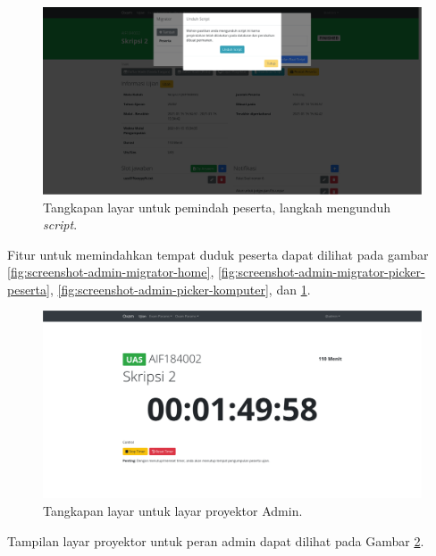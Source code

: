     \begin{figure}
        \centering
        \includegraphics[width=0.7\paperwidth]{Gambar/implemented-interface/admin/migrator-download.png}
        \caption{Tangkapan layar untuk pemindah peserta, langkah mengunduh \textit{script}.}
        \label{fig:screenshot-admin-picker-download}
    \end{figure}
    Fitur untuk memindahkan tempat duduk peserta dapat dilihat pada gambar \ref{fig:screenshot-admin-migrator-home},
    \ref{fig:screenshot-admin-migrator-picker-peserta}, \ref{fig:screenshot-admin-picker-komputer}, dan 
    \ref{fig:screenshot-admin-picker-download}.
    
    \begin{figure}
        \centering
        \includegraphics[width=0.7\paperwidth]{Gambar/implemented-interface/admin/timer-admin.png}
        \caption{Tangkapan layar untuk layar proyektor Admin.}
        \label{fig:screenshot-admin-exam-projector}
    \end{figure}
    Tampilan layar proyektor untuk peran admin dapat dilihat pada Gambar \ref{fig:screenshot-admin-exam-projector}.
    
